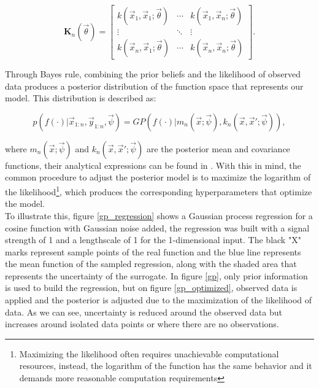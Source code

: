 \documentclass{article}
\begin{document}
\begin{equation}
    \textbf{K}_n(\vec{\theta}) =
    \begin{bmatrix}
        k(\vec{x}_1,\vec{x}_1;\vec{\theta}) & \cdots & k(\vec{x}_1,\vec{x}_n;\vec{\theta}) \\
        \vdots & \ddots & \vdots\\
        k(\vec{x}_n,\vec{x}_1;\vec{\theta}) & \cdots & k(\vec{x}_n,\vec{x}_n;\vec{\theta})
    \end{bmatrix}.
\end{equation}

Through Bayes rule, combining the prior beliefs and the likelihood of observed data produces a posterior distribution of the function space that represents our model. This distribution is described as\cite{Pandita2016}:

\begin{equation}
    p(f(\cdot)|\vec{x}_{1:n},\vec{y}_{1:n},\vec{\psi}) = GP(f(\cdot)|m_n(\vec{x};\vec{\psi}),k_n(\vec{x},\vec{x}';\vec{\psi})),
\end{equation}

where $m_n(\vec{x};\vec{\psi})$ and $k_n(\vec{x},\vec{x}';\vec{\psi})$ are the posterior mean and covariance functions, their analytical expressions can be found in \cite{Pandita2016}. With this in mind, the common procedure to adjust the posterior model is to maximize the logarithm of the likelihood\footnote{Maximizing the likelihood often requires unachievable computational resources, instead, the logarithm of the function has the same behavior and it demands more reasonable computation requirements}, which produces the corresponding hyperparameters that optimize the model.\\

To illustrate this, figure \ref{gp_regression} shows a Gaussian process regression for a cosine function with Gaussian noise added, the regression was built with a signal strength of 1 and a lengthscale of 1 for the 1-dimensional input. The black "X" marks represent sample points of the real function and the blue line represents the mean function of the sampled regression, along with the shaded area that represents the uncertainty of the surrogate. In figure \ref{gp}, only prior information is used to build the regression, but on figure \ref{gp_optimized}, observed data is applied and the posterior is adjusted due to the maximization of the likelihood of data. As we can see, uncertainty is reduced around the observed data but increases around isolated data points or where there are no observations.
\end{document}
